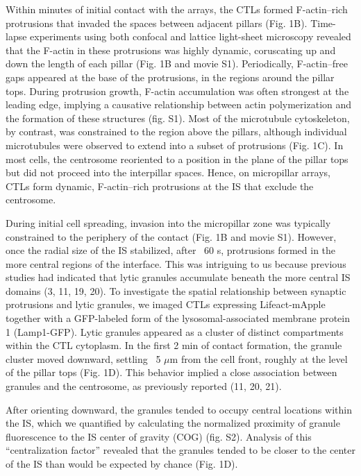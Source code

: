 Within minutes of initial contact with the arrays, the CTLs formed F-actin–rich protrusions that invaded the spaces between adjacent pillars (Fig. 1B). Time-lapse experiments using both confocal and lattice light-sheet microscopy revealed that the F-actin in these protrusions was highly dynamic, coruscating up and down the length of each pillar (Fig. 1B and movie S1). Periodically, F-actin–free gaps appeared at the base of the protrusions, in the regions around the pillar tops. During protrusion growth, F-actin accumulation was often strongest at the leading edge, implying a causative relationship between actin polymerization and the formation of these structures (fig. S1). Most of the microtubule cytoskeleton, by contrast, was constrained to the region above the pillars, although individual microtubules were observed to extend into a subset of protrusions (Fig. 1C). In most cells, the centrosome reoriented to a position in the plane of the pillar tops but did not proceed into the interpillar spaces. Hence, on micropillar arrays, CTLs form dynamic, F-actin–rich protrusions at the IS that exclude the centrosome.

During initial cell spreading, invasion into the micropillar zone was typically constrained to the periphery of the contact (Fig. 1B and movie S1). However, once the radial size of the IS stabilized, after ~60 s, protrusions formed in the more central regions of the interface. This was intriguing to us because previous studies had indicated that lytic granules accumulate beneath the more central IS domains (3, 11, 19, 20). To investigate the spatial relationship between synaptic protrusions and lytic granules, we imaged CTLs expressing Lifeact-mApple together with a GFP-labeled form of the lysosomal-associated membrane protein 1 (Lamp1-GFP). Lytic granules appeared as a cluster of distinct compartments within the CTL cytoplasm. In the first 2 min of contact formation, the granule cluster moved downward, settling ~5 $\mu$m from the cell front, roughly at the level of the pillar tops (Fig. 1D). This behavior implied a close association between granules and the centrosome, as previously reported (11, 20, 21).

After orienting downward, the granules tended to occupy central locations within the IS, which we quantified by calculating the normalized proximity of granule fluorescence to the IS center of gravity (COG) (fig. S2). Analysis of this “centralization factor” revealed that the granules tended to be closer to the center of the IS than would be expected by chance (Fig. 1D).

